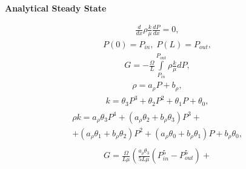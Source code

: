 \documentclass[a4paper,12pt]{extreport}
\begin{document}
    \begin{multicols}{2}
        \begin{center}
        {\large \textbf{Analytical Steady State}}
        \end{center}
        \vspace{-0.2cm}
        \begin{eqnarray}
            \label{eq:poisson_diff}
            \frac{d}{dx}\rho\frac{k}{\mu} \frac{dP}{dx} = 0,
        \end{eqnarray}
        \vspace{-0.5cm}
        \begin{eqnarray}
            \label{eq:poisson_diff_bound}
            P\left(0\right) = P_{in}, \; P\left(L\right) = P_{out},
        \end{eqnarray}
        \vspace{-0.5cm}
        \begin{eqnarray}
            \label{eq:consumption_poisson_diff_geniral}
            G = - \frac{\Omega}{L} \int \limits_{P_{in}}^{P_{out}} \rho\frac{k}{\mu} dP,
        \end{eqnarray}
        \vspace{-0.5cm}
        \begin{eqnarray}
            \label{eq:poisson_dencity_particular}
            \rho = a_{\rho}P + b_{\rho},
        \end{eqnarray}
        \begin{eqnarray}
            \label{eq:poisson_permeability_particular}
            k = \theta_{3}P^3 + \theta_{2}P^2 + \theta_{1}P + \theta_{0},
        \end{eqnarray}
        \begin{eqnarray}
            \label{eq:poisson_rho_k_mu__particular}
            \begin{gathered}
                \rho k = a_{\rho}\theta_{3}P^4 + \left( a_{\rho}\theta_{2} + b_{\rho}\theta_{3}\right)P^3 +\\
                + \left(a_{\rho}\theta_{1} + b_{\rho}\theta_{2}\right)P^2 +
                \left(a_{\rho}\theta_{0} + b_{\rho}\theta_{1}\right)P + b_{\rho}\theta_{0},
            \end{gathered}
        \end{eqnarray}
        \begin{eqnarray}
            \label{eq:consumption_poisson_diff_particular}
            \begin{gathered}
                G =   \frac{\Omega }{L\mu} \left(  \frac{a_{\rho}\theta_{3}}{5L\mu} \left(P_{in}^5 -P_{out}^5 \right) + \right.\\

\end{gathered}
\end{eqnarray}
\end{multicols}
\end{document}

